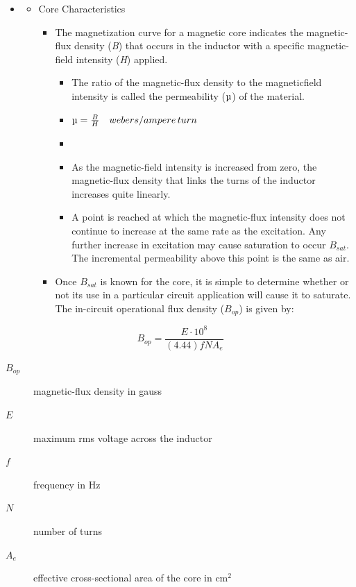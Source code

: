 \begin{itemize}
	\item[]
	\begin{itemize}
		\item Core Characteristics
		\begin{itemize}
			\item The magnetization curve for a magnetic core indicates the magnetic-flux density (\textit{B}) that occurs in the inductor with a specific magnetic-field intensity (\textit{H}) applied. 
			\begin{itemize}
				\item The ratio of the magnetic-flux density to the magneticfield intensity is called the permeability ($\micro$) of the material.
				\item[] $\micro = \frac{B}{H} \quad webers/ampere\,turn$
				\item[]
				\item As the magnetic-field intensity is increased from
				zero, the magnetic-flux density that links the turns of the inductor increases quite linearly.
				\item A point is reached at which the magnetic-flux
				intensity does not continue to increase at the same rate as the excitation. Any further	increase in excitation may cause saturation to occur $B_{sat}$. The incremental permeability above this	point is the same as air.
			\end{itemize}
			\item Once $B_{sat}$ is known for the core, it is simple to determine whether or not its use in a particular circuit application will cause it to saturate. The in-circuit operational flux density ($B_{op}$) is given by:
		\end{itemize}
	\end{itemize}
\end{itemize}

\begin{equation}
B_{op}=\dfrac{E\cdot 10^8}{(4.44)fNA_e}
\end{equation}

\begin{description}
	\item[$B_{op}$] magnetic-flux density in gauss
	\item[$E$] maximum rms voltage across the inductor
	\item[$f$] frequency in \si{\hertz}
	\item[$N$] number of turns
	\item[$A_e$] effective cross-sectional area of the core in $\si{\centi\meter}^2$
\end{description}

